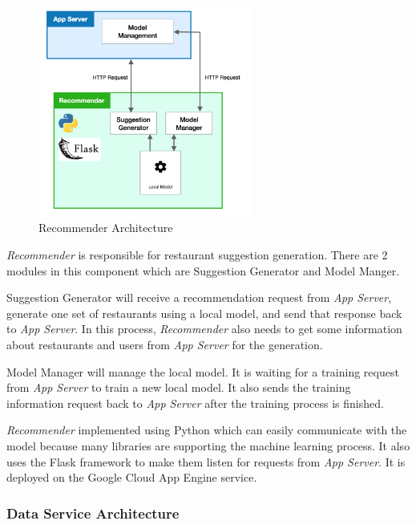 \documentclass[12pt,oneside,openright,a4paper]{cpe-english-project}
\begin{document}
\begin{figure}[H]\centering
\includegraphics[width=200pt]{./images/3arch_recommender.png}
\caption{Recommender Architecture}\label{fig:3arch_recommender}
\end{figure}\vspace{-24pt}

\textit{Recommender} is responsible for restaurant suggestion generation. There are 2 modules in this component which are Suggestion Generator and Model Manger.

Suggestion Generator will receive a recommendation request from \textit{App Server}, generate one set of restaurants using a local model, and send that response back to \textit{App Server}. In this process, \textit{Recommender} also needs to get some information about restaurants and users from \textit{App Server} for the generation.

Model Manager will manage the local model. It is waiting for a training request from \textit{App Server} to train a new local model. It also sends the training information request back to \textit{App Server} after the training process is finished.

\textit{Recommender} implemented using Python which can easily communicate with the model because many libraries are supporting the machine learning process. It also uses the Flask framework to make them listen for requests from \textit{App Server}. It is deployed on the Google Cloud App Engine service.


\subsubsection{Data Service Architecture}
\end{document}
